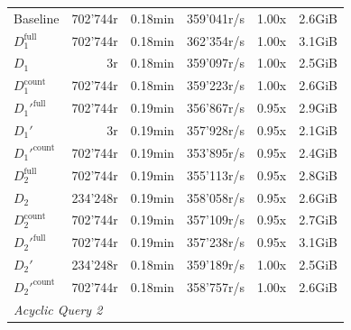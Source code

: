 \begin{longtable}{lrrrrr}
    \nopagebreak
    Baseline              &  702'744r             &  0.18min        &  359'041r/s          & 1.00x             & 2.6GiB    \\
    $D_1^{\text{full}}$   &  702'744r             &  0.18min        &  362'354r/s          & 1.00x             & 3.1GiB    \\
    \quad $D_1$           &  3r                   &  0.18min        &  359'097r/s          & 1.00x             & 2.5GiB    \\
    $D_1^{\text{count}}$  &  702'744r             &  0.18min        &  359'223r/s          & 1.00x             & 2.6GiB    \\
    $D_1'^{\text{full}}$  &  702'744r             &  0.19min        &  356'867r/s          & 0.95x             & 2.9GiB    \\
    \quad $D_1'$          &  3r                   &  0.19min        &  357'928r/s          & 0.95x             & 2.1GiB    \\
    $D_1'^{\text{count}}$ &  702'744r             &  0.19min        &  353'895r/s          & 0.95x             & 2.4GiB    \\
    $D_2^{\text{full}}$   &  702'744r             &  0.19min        &  355'113r/s          & 0.95x             & 2.8GiB    \\
    \quad $D_2$           &  234'248r             &  0.19min        &  358'058r/s          & 0.95x             & 2.6GiB    \\
    $D_2^{\text{count}}$  &  702'744r             &  0.19min        &  357'109r/s          & 0.95x             & 2.7GiB    \\
    $D_2'^{\text{full}}$  &  702'744r             &  0.19min        &  357'238r/s          & 0.95x             & 3.1GiB    \\
    \quad $D_2'$          &  234'248r             &  0.18min        &  359'189r/s          & 1.00x             & 2.5GiB    \\
    $D_2'^{\text{count}}$ &  702'744r             &  0.18min        &  358'757r/s          & 1.00x             & 2.6GiB    \\
    \midrule

    \multicolumn{6}{l}{\textit{Acyclic Query 2}} \\
    \midrule
    

\end{longtable}
